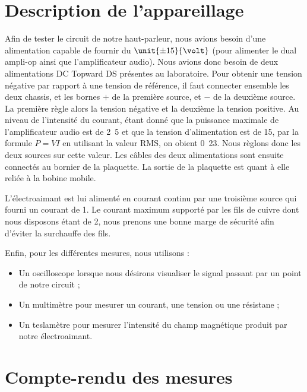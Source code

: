 

\section{Description de l'appareillage}
Afin de tester le circuit de notre haut-parleur, nous avions besoin d'une alimentation
capable de fournir du $\unit{\pm 15}{\volt}$ (pour alimenter le dual ampli-op ainsi
que l'amplificateur audio). Nous avions donc besoin de deux alimentations DC Topward 
 DS présentes au laboratoire. Pour obtenir une tension négative par 
rapport à une tension de référence, il faut connecter ensemble les deux chassis,
et les bornes $+$ de la première source, et $-$ de la deuxième source. La première règle
alors la tension négative et la deuxième la tension positive\cite{dctopward}.
Au niveau de l'intensité du courant, étant donné que la puissance maximale de l'amplificateur
audio est de \unit{2.5}{\watt}\cite{datasheetampli} et que la tension d'alimentation est de \unit{15}{\volt}, par
la formule $P = VI$ en utilisant la valeur RMS, on obient \unit{0.23}{\ampere}. Nous règlons
donc les deux sources sur cette valeur. Les câbles des deux alimentations sont ensuite connectés 
au bornier de la plaquette. La sortie de la plaquette est quant à elle reliée à la bobine mobile.

L'électroaimant est lui alimenté en courant continu par une troisième source qui 
fourni un courant de \unit{1}{\ampere}. Le courant maximum supporté par les fils de 
cuivre dont nous disposons étant de \unit{2}{\ampere}\cite{norme-cuivre}, nous prenons
une bonne marge de sécurité afin d'éviter la surchauffe des fils.

Enfin, pour les différentes mesures, nous utilisons :

\begin{itemize}
	\item Un oscilloscope lorsque nous désirons visualiser le signal passant par un point de notre circuit ;
	\item Un multimètre pour mesurer un courant, une tension ou une résistane ;
	\item Un teslamètre pour mesurer l'intensité du champ magnétique produit par notre électroaimant.
\end{itemize}

\section{Compte-rendu des mesures}

